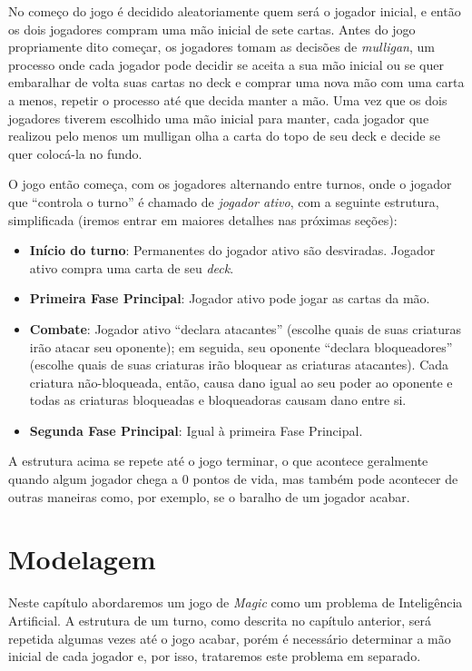 \documentclass{book}
\begin{document}
No começo do jogo é decidido aleatoriamente quem será o jogador inicial,
e então os dois jogadores compram uma mão inicial de sete cartas.
Antes do jogo propriamente dito começar, os jogadores tomam as decisões
de \textit{mulligan}, um processo onde cada jogador pode decidir
se aceita a sua mão inicial ou se quer embaralhar de volta suas cartas
no deck e comprar uma nova mão com uma carta a menos, repetir o processo
até que decida manter a mão. Uma vez que os dois jogadores tiverem
escolhido uma mão inicial para manter, cada jogador que realizou pelo
menos um mulligan
olha a carta do topo de seu deck e decide se quer colocá-la no fundo.

O jogo então começa, com os jogadores alternando entre turnos, onde o
jogador que ``controla o turno'' é chamado de \textit{jogador ativo},
com a seguinte estrutura, simplificada (iremos entrar em maiores
detalhes nas próximas seções):

\begin{itemize}
    \item\textbf{Início do turno}: Permanentes do jogador ativo são
desviradas. Jogador ativo compra uma carta de seu \textit{deck}.
    \item\textbf{Primeira Fase Principal}: Jogador ativo pode jogar as
cartas da mão.
    \item \textbf{Combate}: Jogador ativo ``declara atacantes'' (escolhe
quais de suas criaturas irão atacar seu oponente); em seguida, seu
oponente ``declara bloqueadores'' (escolhe quais de suas criaturas irão
bloquear as criaturas atacantes). Cada criatura não-bloqueada, então,
causa dano igual ao seu poder ao oponente e todas as criaturas
bloqueadas e bloqueadoras causam dano entre si.
    \item \textbf{Segunda Fase Principal}: Igual à primeira Fase
Principal.
\end{itemize}

A estrutura acima se repete até o jogo terminar, o que acontece
geralmente quando algum jogador chega a 0 pontos de vida,
mas também pode acontecer de outras maneiras como, por exemplo, se o
baralho de um jogador acabar.

\chapter{Modelagem}

Neste capítulo abordaremos um jogo de \textit{Magic} como um problema de
Inteligência Artificial. A estrutura de um turno, como descrita
 no capítulo anterior, será repetida algumas vezes até o jogo acabar,
porém é necessário determinar a mão inicial de cada jogador e, por isso,
 trataremos este problema em separado.
\end{document}
